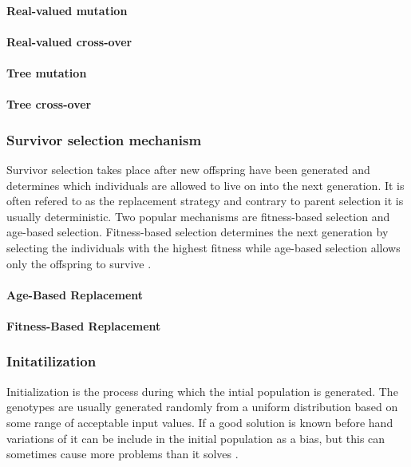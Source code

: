 \paragraph{Real-valued mutation}

\paragraph{Real-valued cross-over}

\paragraph{Tree mutation}

\paragraph{Tree cross-over}


\subsubsection{Survivor selection mechanism}

Survivor selection takes place after new offspring have been generated and determines which individuals are allowed to live on into the next generation. It is often refered to as the replacement strategy and contrary to parent selection it is usually deterministic. Two popular mechanisms are fitness-based selection and age-based selection. Fitness-based selection determines the next generation by selecting the individuals with the highest fitness while age-based selection allows only the offspring to survive \cite{Eiben2015_whatevolutionary}.

\paragraph{Age-Based Replacement}

\paragraph{Fitness-Based Replacement}



\subsubsection{Initatilization}

Initialization is the process during which the intial population is generated. The genotypes are usually generated randomly from a uniform distribution based on some range of acceptable input values. If a good solution is known before hand variations of it can be include in the initial population as a bias, but this can sometimes cause more problems than it solves \cite{Eiben20021}.

